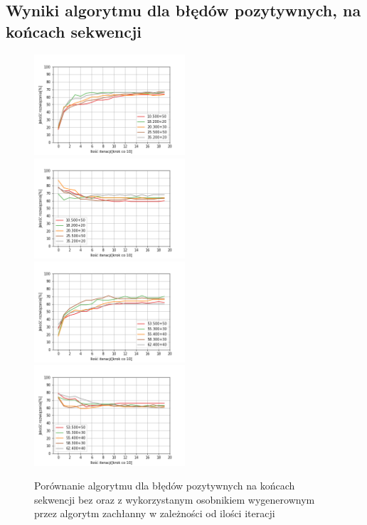 \documentclass{article}
\begin{document}
\subsection{Wyniki algorytmu dla błędów pozytywnych, na końcach sekwencji}
\begin{figure}[H]
\includegraphics[width=0.5\textwidth]{poz-oli1.png}
\includegraphics[width=0.5\textwidth]{poz-oli-greedy1.png}
\includegraphics[width=0.5\textwidth]{poz-oli2.png}
\includegraphics[width=0.5\textwidth]{poz-oli-greedy2.png}
\caption{Porównanie algorytmu dla błędów pozytywnych na końcach sekwencji bez oraz z wykorzystanym osobnikiem wygenerownym przez algorytm zachłanny w zależności od ilości iteracji}
\end{figure}
\end{document}
